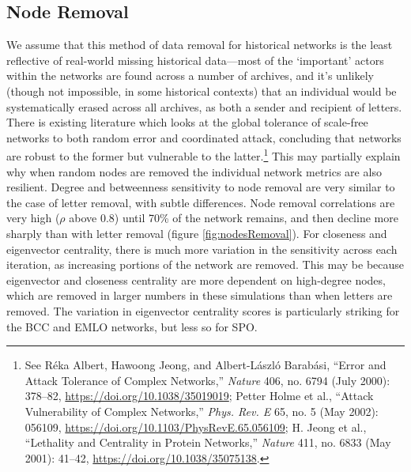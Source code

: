 \documentclass[]{article}
\begin{document}
\hypertarget{node-removal}{%
\subsection{Node Removal}\label{node-removal}}

We assume that this method of data removal for historical networks is the least reflective of real-world missing historical data---most of the `important' actors within the networks are found across a number of archives, and it's unlikely (though not impossible, in some historical contexts) that an individual would be systematically erased across all archives, as both a sender and recipient of letters. There is existing literature which looks at the global tolerance of scale-free networks to both random error and coordinated attack, concluding that networks are robust to the former but vulnerable to the latter.\footnote{See Réka Albert, Hawoong Jeong, and Albert-László Barabási, ``Error and Attack Tolerance of Complex Networks,'' \emph{Nature} 406, no. 6794 (July 2000): 378--82, \url{https://doi.org/10.1038/35019019}; Petter Holme et al., ``Attack Vulnerability of Complex Networks,'' \emph{Phys. Rev. E} 65, no. 5 (May 2002): 056109, \url{https://doi.org/10.1103/PhysRevE.65.056109}; H. Jeong et al., ``Lethality and Centrality in Protein Networks,'' \emph{Nature} 411, no. 6833 (May 2001): 41--42, \url{https://doi.org/10.1038/35075138}.} This may partially explain why when random nodes are removed the individual network metrics are also resilient. Degree and betweenness sensitivity to node removal are very similar to the case of letter removal, with subtle differences. Node removal correlations are very high (\(\rho\) above 0.8) until 70\% of the network remains, and then decline more sharply than with letter removal (figure \ref{fig:nodesRemoval}). For closeness and eigenvector centrality, there is much more variation in the sensitivity across each iteration, as increasing portions of the network are removed. This may be because eigenvector and closeness centrality are more dependent on high-degree nodes, which are removed in larger numbers in these simulations than when letters are removed. The variation in eigenvector centrality scores is particularly striking for the BCC and EMLO networks, but less so for SPO.
\end{document}
